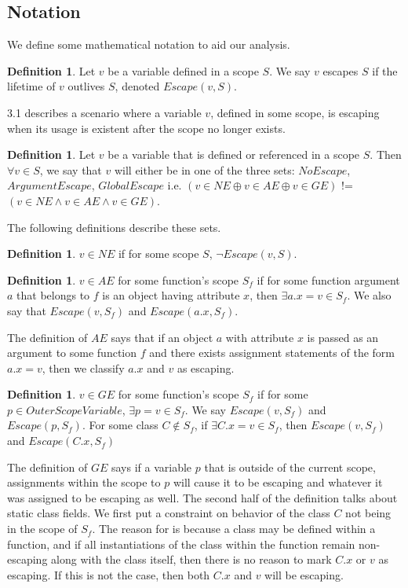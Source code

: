 \documentclass[11pt,article]{amsart}
\theoremstyle{definition}
\newtheorem{definition}[theorem]{Definition}
\numberwithin{equation}{subsection}
\begin{document}
\begin{multicols}{2}
\section{Notation}
We define some mathematical notation to aid our analysis. 
\begin{definition}
Let $v$ be a variable defined in a scope $S$. We say $v$ escapes $S$ if the lifetime of $v$ outlives $S$, denoted $Escape(v,S)$.
\end{definition}
3.1 describes a scenario where a variable $v$, defined in some scope, is escaping when its usage is existent after the scope no longer exists.  
\begin{definition}
Let $v$ be a variable that is defined or referenced in a scope $S$. Then $\forall v\in S$, we say that $v$ will either be in one of the three sets: $NoEscape$, $ArgumentEscape$, $GlobalEscape$ i.e. $(v\in NE \oplus v\in AE \oplus v\in GE)$ != $(v\in NE \wedge v\in AE \wedge v\in GE)$. 
\end{definition}
The following definitions describe these sets.  
\begin{definition}
$v\in NE$ if for some scope $S$, $\neg Escape(v,S)$.
\end{definition}
\begin{definition}
$v\in AE$ for some function's scope $S_f$ if for some function argument $a$ that belongs to $f$ is an object having attribute $x$, then $\exists a.x = v \in S_f$. We also say that $Escape(v, S_f)$ and $Escape(a.x, S_f)$.
\end{definition}
The definition of $AE$ says that if an object $a$ with attribute $x$ is passed as an argument to some function $f$ and there exists assignment statements of the form $a.x = v$, then we classify $a.x$ and $v$ as escaping. 
\begin{definition}
$v\in GE$ for some function's scope $S_f$ if for some $p \in OuterScopeVariable$, $\exists p = v \in S_f$. We say $Escape(v, S_f)$ and $Escape(p, S_f)$. For some class $C \notin S_f$, if $\exists C.x = v \in S_f$, then $Escape(v, S_f)$ and $Escape(C.x, S_f)$
\end{definition}
The definition of $GE$ says if a variable $p$ that is outside of the current scope, assignments within the scope to $p$ will cause it to be escaping and whatever it was assigned to be escaping as well. The second half of the definition talks about static class fields. We first put a constraint on behavior of the class $C$ not being in the scope of $S_f$. The reason for is because a class may be defined within a function, and if all instantiations of the class within the function remain non-escaping along with the class itself, then there is no reason to mark $C.x$ or $v$ as escaping. If this is not the case, then both $C.x$ and $v$ will be escaping. 


\end{multicols}
\end{document}
